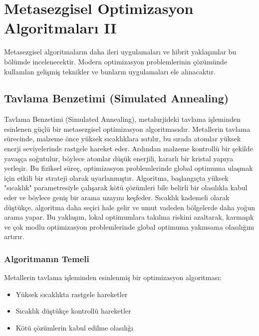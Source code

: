 \section{Metasezgisel Optimizasyon Algoritmaları II}
Metasezgisel algoritmaların daha ileri uygulamaları ve hibrit yaklaşımlar bu bölümde incelenecektir. Modern optimizasyon problemlerinin çözümünde kullanılan gelişmiş teknikler ve bunların uygulamaları ele alınacaktır.

\subsection{Tavlama Benzetimi (Simulated Annealing) }
Tavlama Benzetimi (Simulated Annealing), metalurjideki tavlama işleminden esinlenen güçlü bir metasezgisel optimizasyon algoritmasıdır. Metallerin tavlama sürecinde, malzeme önce yüksek sıcaklıklara ısıtılır, bu sırada atomlar yüksek enerji seviyelerinde rastgele hareket eder. Ardından malzeme kontrollü bir şekilde yavaşça soğutulur, böylece atomlar düşük enerjili, kararlı bir kristal yapıya yerleşir. Bu fiziksel süreç, optimizasyon problemlerinde global optimuma ulaşmak için etkili bir strateji olarak uyarlanmıştır. Algoritma, başlangıçta yüksek "sıcaklık" parametresiyle çalışarak kötü çözümleri bile belirli bir olasılıkla kabul eder ve böylece geniş bir arama uzayını keşfeder. Sıcaklık kademeli olarak düştükçe, algoritma daha seçici hale gelir ve umut vadeden bölgelerde daha yoğun arama yapar. Bu yaklaşım, lokal optimumlara takılma riskini azaltarak, karmaşık ve çok modlu optimizasyon problemlerinde global optimuma yakınsama olasılığını artırır. 

\subsubsection{Algoritmanın Temeli}
Metallerin tavlama işleminden esinlenmiş bir optimizasyon algoritması:
\begin{itemize}
    \item Yüksek sıcaklıkta rastgele hareketler
    \item Sıcaklık düştükçe kontrollü hareketler
    \item Kötü çözümlerin kabul edilme olasılığı
\end{itemize}

